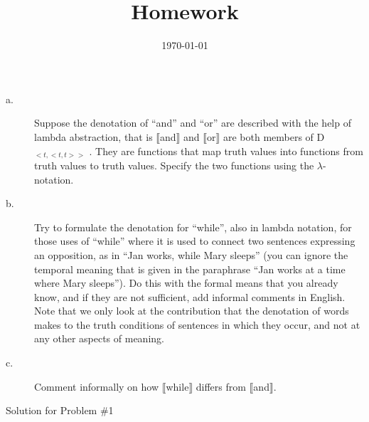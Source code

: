 \documentclass[11pt]{article}
\title{Homework \hwnumber} %
\author{\myname} %
\date{\textbf{\mycourse} \hfill {\today} \hfill \textbf{\semesteryear}} %
\begin{document}
\thispagestyle{empty} %

\clearpage %
\maketitle


\begin{problem}{1}
\begin{description}
    \item[a.] Suppose the denotation of ``and'' and ``or'' are described with the help of lambda abstraction, that is $\llbracket$and$\rrbracket$ and $\llbracket$or$\rrbracket$ are both members of D$_{<t,<t,t>>}$ . They are functions that map truth values into functions from truth values to truth values. Specify the two functions using the $\lambda$-notation.

    \item[b.] Try to formulate the denotation for ``while'', also in lambda notation, for those uses of ``while'' where it is used to connect two sentences expressing an opposition, as in ``Jan works, while Mary sleeps'' (you can ignore the temporal meaning that is given in the paraphrase ``Jan works at a time where Mary sleeps''). Do this with the formal means that you already know, and if they are not sufficient, add informal comments in English. Note that we only look at the contribution that the denotation of words makes to the truth conditions of sentences in which they occur, and not at any other aspects of meaning.

    \item[c.] Comment informally on how $\llbracket$while$\rrbracket$ differs from $\llbracket$and$\rrbracket$.
\end{description}
\end{problem}

\begin{solution}
Solution for Problem \#1
\end{solution}

\vspace*{0.5cm} %
\end{document}
